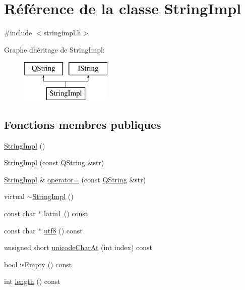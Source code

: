 \hypertarget{class_string_impl}{}\section{Référence de la classe String\+Impl}
\label{class_string_impl}


{\ttfamily \#include $<$stringimpl.\+h$>$}

Graphe d\textquotesingle{}héritage de String\+Impl\+:\begin{figure}[H]
\begin{center}
\leavevmode
\includegraphics[height=2.000000cm]{class_string_impl}
\end{center}
\end{figure}
\subsection*{Fonctions membres publiques}
\begin{DoxyCompactItemize}
\item 
\hyperlink{class_string_impl_a6ea8063ec8f1971798919fd428129ce1}{String\+Impl} ()
\item 
\hyperlink{class_string_impl_a706bd009849da2787615fbd20d1494b1}{String\+Impl} (const \hyperlink{class_q_string}{Q\+String} \&str)
\item 
\hyperlink{class_string_impl}{String\+Impl} \& \hyperlink{class_string_impl_a38a349596d9bd22b2dd14d2ea02edbc1}{operator=} (const \hyperlink{class_q_string}{Q\+String} \&str)
\item 
virtual \hyperlink{class_string_impl_aeba49942538176918e14adce364dcede}{$\sim$\+String\+Impl} ()
\item 
const char $\ast$ \hyperlink{class_string_impl_a9b897fe485d0e6da85f90205d274f073}{latin1} () const 
\item 
const char $\ast$ \hyperlink{class_string_impl_ade32d6a3f749af91841a706e24343c87}{utf8} () const 
\item 
unsigned short \hyperlink{class_string_impl_aed7fee14e67b5d772c84a5c89572ffa6}{unicode\+Char\+At} (int index) const 
\item 
\hyperlink{qglobal_8h_a1062901a7428fdd9c7f180f5e01ea056}{bool} \hyperlink{class_string_impl_a8bf67a2571c40e77d414cc9fdfef5c8e}{is\+Empty} () const 
\item 
int \hyperlink{class_string_impl_a044825b30aad6b50255d6125ab7da39a}{length} () const 
\end{DoxyCompactItemize}
